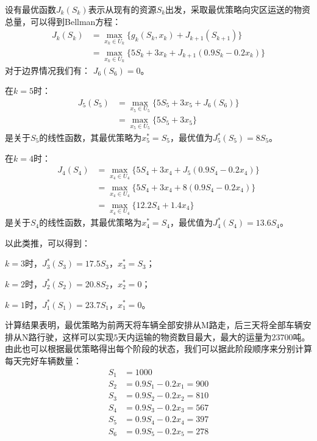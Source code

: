 \begin{example}
    设有最优函数$J_k(S_k)$表示从现有的资源$S_k$出发，采取最优策略向灾区运送的物资总量，可以得到Bellman方程：
    \begin{equation}
        \begin{aligned}
            J_k(S_k) & = \max_{x_k\in U_k}\{g_k(S_k, x_k)+ J_{k+1}(S_{k+1})\}  \\
                     & = \max_{x_k\in U_k}\{5S_k+3x_k+J_{k+1}(0.9S_k-0.2x_k)\}
        \end{aligned}
    \end{equation}
    对于边界情况我们有： $J_6(S_6) = 0$。

    在$k= 5$时：
    \begin{equation}
        \begin{aligned}
            J_5(S_5) & = \max_{x_5\in U_5}\{5S_5+3x_5+J_6(S_6)\} \\
                     & = \max_{x_5\in U_5}\{5S_5+3x_5\}
        \end{aligned}
    \end{equation}
    是关于$S_5$的线性函数，其最优策略为$x_5^* = S_5$，最优值为$J_5^*(S_5) = 8S_5$。

    在$k= 4$时：
    \begin{equation}
        \begin{aligned}
            J_4(S_4) & = \max_{x_4\in U_4}\{5S_4+3x_4+J_5(0.9S_4-0.2x_4)\} \\
                     & = \max_{x_4\in U_4}\{5S_4+3x_4+8(0.9S_4-0.2x_4)\}   \\
                     & = \max_{x_4\in U_4}\{12.2S_4+1.4x_4\}
        \end{aligned}
    \end{equation}
    是关于$S_4$的线性函数，其最优策略为$x_4^* = S_4$，最优值为$J_4^*(S_4) = 13.6S_4$。

    以此类推，可以得到：

    $k= 3$时，$J_3^*(S_3) = 17.5S_3$，$x_3^* = S_3$；

    $k= 2$时，$J_2^*(S_2) = 20.8S_2$，$x_2^* = 0$；

    $k= 1$时，$J_1^*(S_1) = 23.7S_1$，$x_1^* = 0$。

    计算结果表明，最优策略为前两天将车辆全部安排从M路走，后三天将全部车辆安排从N路行驶，这样可以实现$5$天内运输的物资数目最大，最大的运量为$23700$吨。由此也可以根据最优策略得出每个阶段的状态，我们可以据此阶段顺序来分别计算每天完好车辆数量：
    \begin{equation}
        \begin{aligned}
            S_1 & = 1000                \\
            S_2 & = 0.9S_1-0.2x_1 = 900 \\
            S_3 & = 0.9S_2-0.2x_2 = 810 \\
            S_4 & = 0.9S_3-0.2x_3 = 567 \\
            S_5 & = 0.9S_4-0.2x_4 = 397 \\
            S_6 & = 0.9S_5-0.2x_5 = 278 \\
        \end{aligned}
    \end{equation}

\end{example}



